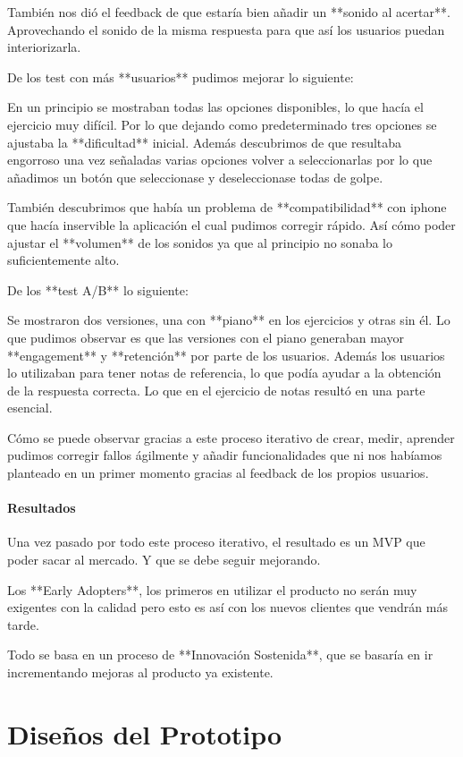 \documentclass[12pt,twoside,titlepage]{report}
\begin{document}
También nos dió el feedback de que estaría bien añadir un **sonido al acertar**. Aprovechando el sonido de la misma respuesta para que así los usuarios puedan interiorizarla.

De los test con más **usuarios** pudimos mejorar lo siguiente:

En un principio se mostraban todas las opciones disponibles, lo que hacía el ejercicio muy difícil. Por lo que dejando como predeterminado tres opciones se ajustaba la **dificultad** inicial. Además descubrimos de que resultaba engorroso una vez señaladas varias opciones volver a seleccionarlas por lo que añadimos un botón que seleccionase y deseleccionase todas de golpe.

También descubrimos que había un problema de **compatibilidad** con iphone que hacía inservible la aplicación el cual pudimos corregir rápido. Así cómo poder ajustar el **volumen** de los sonidos ya que al principio no sonaba lo suficientemente alto.

De los **test A/B** lo siguiente:

Se mostraron dos versiones, una con **piano** en los ejercicios y otras sin él. Lo que pudimos observar es que las versiones con el piano generaban mayor **engagement** y **retención** por parte de los usuarios. Además los usuarios lo utilizaban para tener notas de referencia, lo que podía ayudar a la obtención de la respuesta correcta. Lo que en el ejercicio de notas resultó en una parte esencial.

Cómo se puede observar gracias a este proceso iterativo de crear, medir, aprender pudimos corregir fallos ágilmente y añadir funcionalidades que ni nos habíamos planteado en un primer momento gracias al feedback de los propios usuarios.

\subsubsection{Resultados}

Una vez pasado por todo este proceso iterativo, el resultado es un MVP que poder sacar al mercado. Y que se debe seguir mejorando. 

Los **Early Adopters**, los primeros en utilizar el producto no serán muy exigentes con la calidad pero esto es así con los nuevos clientes que vendrán más tarde. 

Todo se basa en un proceso de **Innovación Sostenida**, que se basaría en ir incrementando mejoras al producto ya existente.

\chapter{Diseños del Prototipo}
\end{document}
